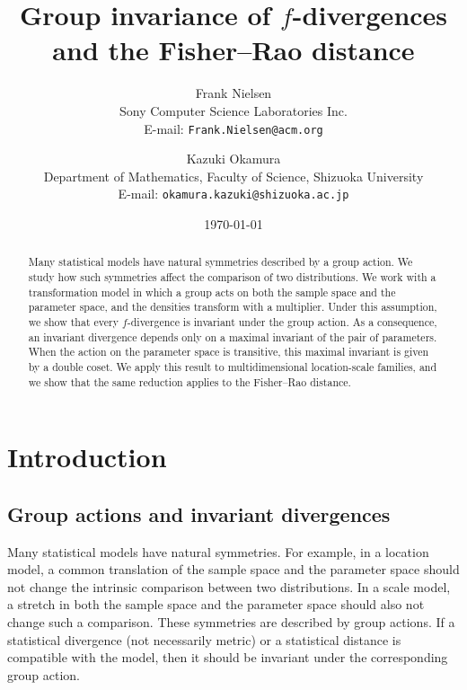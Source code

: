 \documentclass[a4paper, reqno, 11pt]{article}
\theoremstyle{definition}
\begin{document}
\title{Group invariance of $f$-divergences and the Fisher--Rao distance}



\author{
Frank Nielsen\\
Sony Computer Science Laboratories Inc.\\
E-mail: {\tt Frank.Nielsen@acm.org} 
\and 
Kazuki Okamura\\
Department of Mathematics, Faculty of Science, Shizuoka University\\
E-mail:  {\tt okamura.kazuki@shizuoka.ac.jp}
}
\date{\today}

\maketitle

\begin{abstract}
Many statistical models have natural symmetries described by a group action. 
We study how such symmetries affect the comparison of two distributions. 
We work with a transformation model in which a group acts on both the sample space and the parameter space, and the densities transform with a multiplier. 
Under this assumption, we show that every $f$-divergence is invariant under the group action. As a consequence, an invariant divergence depends only on a maximal invariant of the pair of parameters. 
When the action on the parameter space is transitive, this maximal invariant is given by a double coset. 
We apply this result to multidimensional location-scale families, and we show that the same reduction applies to the Fisher--Rao distance.
\end{abstract}

\section{Introduction}

\subsection{Group actions and invariant divergences}
Many statistical models have natural symmetries. 
For example, in a location model, a common translation of the sample space and the parameter space should not change the intrinsic comparison between two distributions. 
In a scale model, a stretch in both the sample space and the parameter space should also not change such a comparison. 
These symmetries are described by group actions. 
If a statistical divergence (not necessarily metric) or a statistical distance is compatible with the model, then it should be invariant under the corresponding group action.
\end{document}
